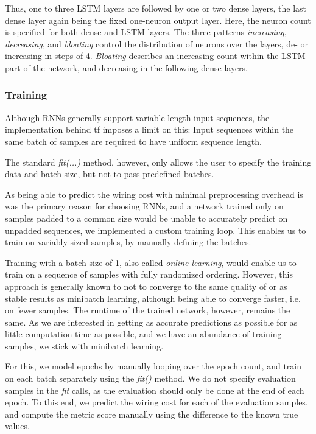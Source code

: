 Thus, one to three \gls{LSTM} layers are followed by one or two dense layers, the last dense layer again being the fixed one-neuron output layer. Here, the neuron count is specified for both dense and \gls{LSTM} layers. The three patterns \textit{increasing}, \textit{decreasing}, and \textit{bloating} control the distribution of neurons over the layers, de- or increasing in steps of 4. \textit{Bloating} describes an increasing count within the \gls{LSTM} part of the network, and decreasing in the following dense layers.

\subsubsection{Training}

Although \glspl{RNN} generally support variable length input sequences, the implementation behind \gls{tf} imposes a limit on this: Input sequences within the same batch of samples are required to have uniform sequence length.

The standard \textit{fit(...)} method, however, only allows the user to specify the training data and batch size, but not to pass predefined batches.

As being able to predict the wiring cost with minimal preprocessing overhead is was the primary reason for choosing \glspl{RNN}, and a network trained only on samples padded to a common size would be unable to accurately predict on unpadded sequences, we implemented a custom training loop. This enables us to train on variably sized samples, by manually defining the batches.

Training with a batch size of 1, also called \textit{online learning}, would enable us to train on a sequence of samples with fully randomized ordering. However, this approach is generally known to not to converge to the same quality of or as stable results as minibatch learning, although being able to converge faster, i.e. on fewer samples. The runtime of the trained network, however, remains the same. As we are interested in getting as accurate predictions as possible for as little computation time as possible, and we have an abundance of training samples, we stick with minibatch learning.

For this, we model epochs by manually looping over the epoch count, and train on each batch separately using the \textit{fit()} method. We do not specify evaluation samples in the \textit{fit} calls, as the evaluation should only be done at the end of each epoch. To this end, we predict the wiring cost for each of the evaluation samples, and compute the metric score manually using the difference to the known true values.

